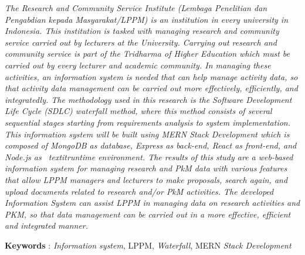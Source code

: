 
\textit{
	The Research and Community Service Institute \emph{(Lembaga Penelitian dan Pengabdian kepada Masyarakat/LPPM)} 
	is an institution in 
	every university in Indonesia. This institution is tasked with managing research and community service carried out by lecturers at the University. Carrying out research and community service is part of the Tridharma of Higher Education which must be carried out by every lecturer and academic community. In managing these activities, an information system is needed that can help manage activity data, so that activity data management can be carried out more effectively, efficiently, and integratedly. The methodology used in this research is the \textit{Software Development Life Cycle \emph{(SDLC)}} waterfall method, where this method consists of several sequential stages starting from requirements analysis to system implementation. This information system will be built using MERN \textit{Stack Development} which is composed of MongoDB as \textit{database}, Express as \textit{back-end}, React as \textit{front-end}, and Node.js as \ textit{runtime environment}. The results of this study are a web-based information system for managing research and PkM data with various features that allow LPPM managers and lecturers to make proposals, search again, and upload documents related to research and/or PkM activities. The developed Information System can assist LPPM in managing data on research activities and PKM, so that data management can be carried out in a more effective, efficient and integrated manner.
}

\noindent\textbf{Keywords} : \textit{Information system}, LPPM, \textit{Waterfall}, MERN \textit{Stack Development}